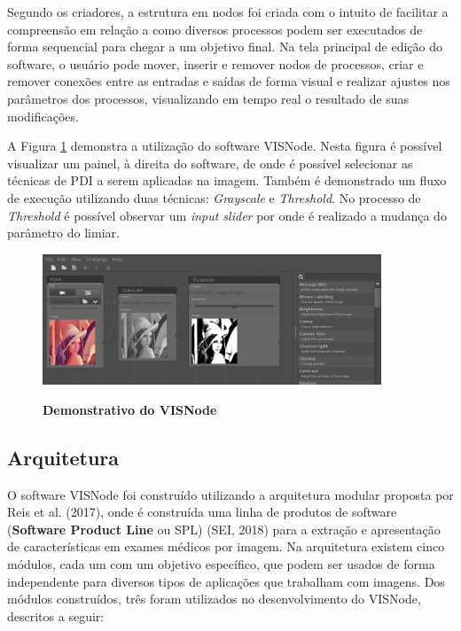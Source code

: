 \documentclass[
	12pt,				%
	oneside,			%
	a4paper,			%
	english,			%
	french,				%
	spanish,			%
	brazil,				%
	]{abntex2}
\begin{document}
Segundo os criadores, a estrutura em nodos foi criada com o intuito de facilitar a compreensão em relação a como diversos processos podem ser executados de forma sequencial para chegar a um objetivo final. Na tela principal de edição do software, o usuário pode mover, inserir e remover nodos de processos, criar e remover conexões entre as entradas e saídas de forma visual e realizar ajustes nos parâmetros dos processos, visualizando em tempo real o resultado de suas modificações.

A Figura \ref{fig:visnode} demonstra a utilização do software VISNode. Nesta figura é possível visualizar um painel, à direita do software, de onde é possível selecionar as técnicas de PDI a serem aplicadas na imagem. Também é demonstrado um fluxo de execução utilizando duas técnicas: \textit{Grayscale} e \textit{Threshold}. No processo de \textit{Threshold} é possível observar um \textit{input slider} por onde é realizado a mudança do parâmetro do limiar.

\begin{figure}[ht]
\centering
\caption{\textbf{Demonstrativo do VISNode}}
\includegraphics[width=0.9\textwidth]{imagens/visnode.png}
\sourceAuthor
\label{fig:visnode}
\end{figure}

\subsection{Arquitetura}

O software VISNode foi construído utilizando a arquitetura modular proposta por Reis et al. (2017), onde é construída uma linha de produtos de software (\textbf{Software Product Line} ou SPL) (SEI, 2018)  para a extração e apresentação de características em exames médicos por imagem. Na arquitetura existem cinco módulos, cada um com um objetivo específico, que podem ser usados de forma independente para diversos tipos de aplicações que trabalham com imagens. Dos módulos construídos, três foram utilizados no desenvolvimento do VISNode, descritos a seguir:
\end{document}
